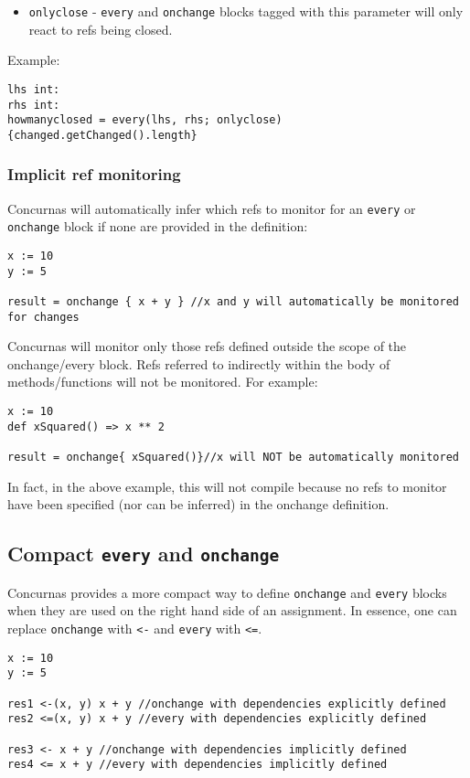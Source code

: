 \documentclass[conc-doc]{subfiles}
\begin{document}
\begin{itemize}
	\item \lstinline{onlyclose} - \lstinline{every} and \lstinline{onchange} blocks tagged with this parameter will only react to refs being closed.
\end{itemize}

Example:

\begin{lstlisting}
lhs int:
rhs int:
howmanyclosed = every(lhs, rhs; onlyclose){changed.getChanged().length}
\end{lstlisting}	

\subsubsection{Implicit ref monitoring}
Concurnas will automatically infer which refs to monitor for an \lstinline{every} or \lstinline{onchange} block if none are provided in the definition:
\begin{lstlisting}
x := 10
y := 5

result = onchange { x + y } //x and y will automatically be monitored for changes
\end{lstlisting}

Concurnas will monitor only those refs defined outside the scope of the onchange/every block. Refs referred to indirectly within the body of methods/functions will not be monitored. For example:
\begin{lstlisting}
x := 10
def xSquared() => x ** 2

result = onchange{ xSquared()}//x will NOT be automatically monitored
\end{lstlisting}

In fact, in the above example, this will not compile because no refs to monitor have been specified (nor can be inferred) in the onchange definition.

\subsection{Compact \lstinline{every} and \lstinline{onchange}}
Concurnas provides a more compact way to define \lstinline{onchange} and \lstinline{every} blocks when they are used on the right hand side of an assignment. In essence, one can replace \lstinline{onchange} with \lstinline{<-} and \lstinline{every} with \lstinline{<=}.

\begin{lstlisting}
x := 10
y := 5

res1 <-(x, y) x + y //onchange with dependencies explicitly defined
res2 <=(x, y) x + y //every with dependencies explicitly defined

res3 <- x + y //onchange with dependencies implicitly defined
res4 <= x + y //every with dependencies implicitly defined
\end{lstlisting}
\end{document}
